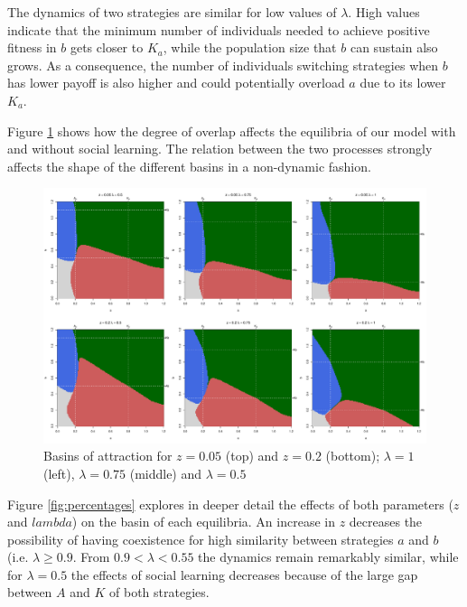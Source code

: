 \documentclass[preprint,authoryear]{elsarticle}
\begin{document}
The dynamics of two strategies are similar for low values of $\lambda$. High values indicate that the minimum number of individuals needed to achieve positive fitness in $b$ gets closer to $K_a$, while the population size that $b$ can sustain also grows. As a consequence, the number of individuals switching strategies when $b$ has lower payoff is also higher and could potentially overload $a$ due to its lower $K_a$.

Figure \ref{fig:overlap} shows how the degree of overlap affects the equilibria of our model with and without social learning. The relation between the two processes strongly affects the shape of the different basins in a non-dynamic fashion.


\begin{figure}[h!]
  \centering
      \includegraphics[width=\textwidth]{./figures/figure5}
  \caption{Basins of attraction for $z=0.05$ (top) and $z=0.2$ (bottom); $\lambda=1$ (left), $\lambda=0.75$ (middle) and $\lambda=0.5$}
    \label{fig:overlap}
\end{figure}

Figure \ref{fig:percentages} explores in deeper detail the effects of both parameters ($z$ and $lambda$) on the basin of each equilibria. An increase in $z$ decreases the possibility of having coexistence for high similarity between strategies $a$ and $b$ (i.e. $\lambda \geq 0.9$. From $0.9 < \lambda < 0.55$ the dynamics remain remarkably similar, while for $\lambda = 0.5$ the effects of social learning decreases because of the large gap between $A$ and $K$ of both strategies.
\end{document}
